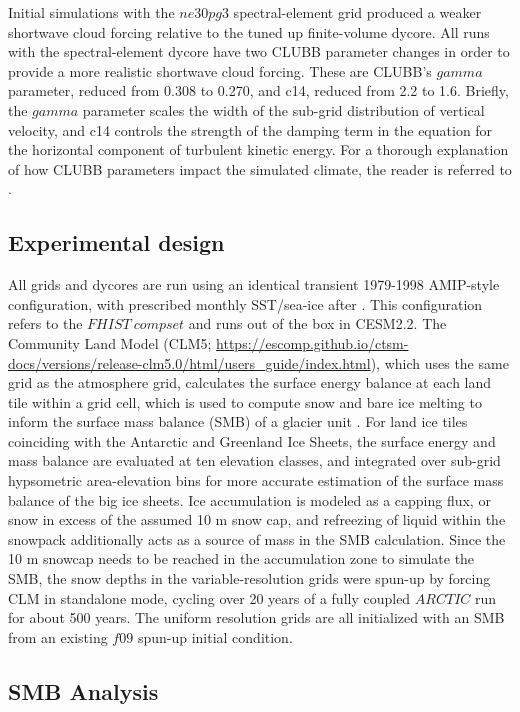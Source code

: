 \documentclass[draft]{agujournal2019}
\begin{document}
Initial simulations with the $ne30pg3$ spectral-element grid produced a weaker shortwave cloud forcing relative to the tuned up finite-volume dycore. All runs with the spectral-element dycore have two CLUBB parameter changes in order to provide a more realistic shortwave cloud forcing. These are CLUBB's $gamma$ parameter, reduced from 0.308 to 0.270, and c14, reduced from 2.2 to 1.6. Briefly, the $gamma$ parameter scales the width of the sub-grid distribution of vertical velocity, and c14 controls the strength of the damping term in the equation for the horizontal component of turbulent kinetic energy. For a thorough explanation of how CLUBB parameters impact the simulated climate, the reader is referred to \cite{GETAL2015JAMES}.

\subsection{Experimental design}

All grids and dycores are run using an identical transient 1979-1998 AMIP-style configuration, with prescribed monthly SST/sea-ice after \cite{CESMSST}. This configuration refers to the $FHIST \ compset$ and runs out of the box in CESM2.2. The Community Land Model (CLM5; \url{https://escomp.github.io/ctsm-docs/versions/release-clm5.0/html/users_guide/index.html}), which uses the same grid as the atmosphere grid, calculates the surface energy balance at each land tile within a grid cell, which is used to compute snow and bare ice melting to inform the surface mass balance (SMB) of a glacier unit \cite{VKETAL2020JGR}. For land ice tiles coinciding with the Antarctic and Greenland Ice Sheets, the surface energy and mass balance are evaluated at ten elevation classes, and integrated over sub-grid hypsometric area-elevation bins for more accurate estimation of the surface mass balance of the big ice sheets. Ice accumulation is modeled as a capping flux, or snow in excess of the assumed 10 m snow cap, and refreezing of liquid within the snowpack additionally acts as a source of mass in the SMB calculation. Since the 10 m snowcap needs to be reached in the accumulation zone to simulate the SMB, the snow depths in the variable-resolution grids were spun-up by forcing CLM in standalone mode, cycling over 20 years of a fully coupled $ARCTIC$ run for about 500 years. The uniform resolution grids are all initialized with an SMB from an existing $f09$ spun-up initial condition. 

\subsection{SMB Analysis}
\end{document}
